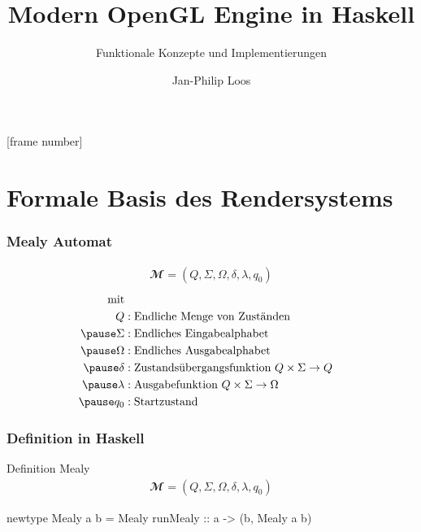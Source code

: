 
[frame number]



\title[Haskell Engine]{Modern OpenGL Engine in Haskell}
\subtitle[Konzepte]{Funktionale Konzepte und Implementierungen}
\author{Jan-Philip Loos}
\date{\protect{}}
\maketitle
{}

\frame{\tableofcontents}
\section{Formale Basis des Rendersystems}
\frame{\sectionpage}

\begin{frame}
  \frametitle{Mealy Automat}
  \begin{Definition}
    \begin{align}
    \mathbfcal{M} = \left( Q, \Sigma, \Omega, \delta, \lambda, q_0 \right)
    \label{def:mealy-formal}
    \end{align}
    \begin{align*}
    	\text{mit}\\
    	Q &: \text{Endliche Menge von Zuständen} \\\pause
    	\Sigma  &:\text{Endliches Eingabealphabet} \\\pause
    	\Omega  &:\text{Endliches Ausgabealphabet} \\\pause
    	\delta  &:\text{Zustandsübergangsfunktion}\ Q \times \Sigma \rightarrow Q \\\pause
    	\lambda &:\text{Ausgabefunktion}\ Q \times \Sigma \rightarrow \Omega \\\pause
    	q_0 &: \text{Startzustand}
    \end{align*}
  \end{Definition}
\end{frame}

\begin{frame}[fragile]
  \frametitle{Definition in Haskell}
  \begin{block}{Definition Mealy}
    \begin{align*}
    \mathbfcal{M} = \left( Q, \Sigma, \Omega, \delta, \lambda, q_0 \right)
    \label{def:mealy-formal}
  \end{align*}
  \end{block}
  \begin{haskell}[label={lst:haskell-mealy},caption={[Definition Mealy in Haskell]Definition Mealy in Haskell\protect\footnotemark}]
newtype Mealy a b = Mealy {
  runMealy :: a -> (b, Mealy a b)
}
  \end{haskell}
\end{frame}

